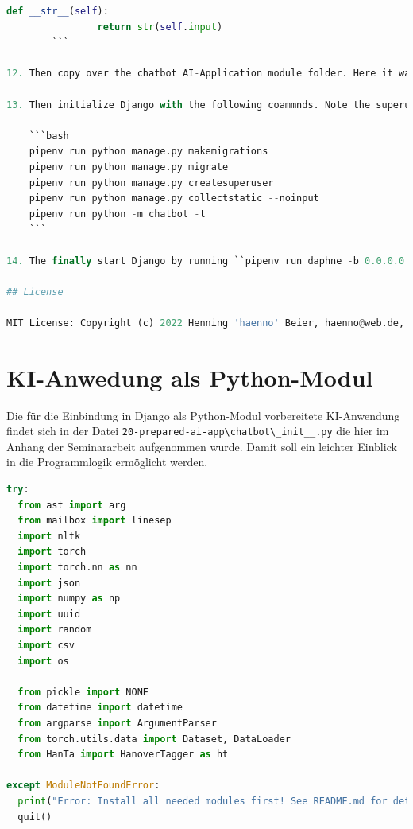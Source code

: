 \documentclass[12pt,oneside,titlepage,listof=totoc,bibliography=totoc]{scrartcl}
\newcommand{\code}[1]{\colorbox{code-gray}{\texttt{#1}}}
\begin{document}
\begin{appendices}
\begin{lstlisting}[language=python,numbers=none]
            def __str__(self):
                return str(self.input)
        ```

12. Then copy over the chatbot AI-Application module folder. Here it was the contents of ``chatbot``-Folder in ``20-prepared-ai-app``. Copy it in the folder, that contains the ``manage.py``-File.

13. Then initialize Django with the following coammnds. Note the superuser credentials!

    ```bash
    pipenv run python manage.py makemigrations
    pipenv run python manage.py migrate
    pipenv run python manage.py createsuperuser
    pipenv run python manage.py collectstatic --noinput 
    pipenv run python -m chatbot -t
    ```

14. The finally start Django by running ``pipenv run daphne -b 0.0.0.0 -p 8000 aiapiproject.asgi:application`` and open <http://127.0.0.1:8000>.

## License

MIT License: Copyright (c) 2022 Henning 'haenno' Beier, haenno@web.de, <https://github.com/haenno/ai-api>
\end{lstlisting}
  

\section{KI-Anwedung als Python-Modul}\label{notes-ai-app-as-module}

Die für die Einbindung in Django als Python-Modul vorbereitete KI-Anwendung findet sich in der Datei \code{20-prepared-ai-app\textbackslash chatbot\textbackslash _init__.py} die hier im Anhang der Seminararbeit aufgenommen wurde. Damit soll ein leichter Einblick in die Programmlogik ermöglicht werden.

\vspace{0.6cm} 

\begin{lstlisting}[language=python]
try:
  from ast import arg
  from mailbox import linesep
  import nltk
  import torch
  import torch.nn as nn
  import json
  import numpy as np
  import uuid
  import random
  import csv
  import os

  from pickle import NONE
  from datetime import datetime
  from argparse import ArgumentParser
  from torch.utils.data import Dataset, DataLoader
  from HanTa import HanoverTagger as ht

except ModuleNotFoundError:
  print("Error: Install all needed modules first! See README.md for details...")
  quit()


\end{lstlisting}
\end{appendices}
\end{document}
